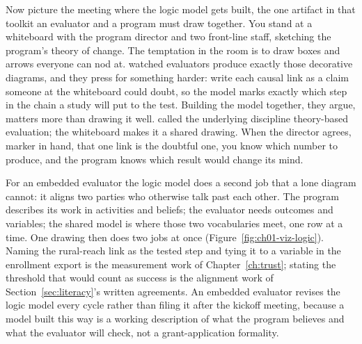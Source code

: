 Now picture the meeting where the logic model gets built, the one artifact in that toolkit an evaluator and a program must draw together. You stand at a whiteboard with the program director and two front-line staff, sketching the program's theory of change. The temptation in the room is to draw boxes and arrows everyone can nod at. \textcite{funnell2011purposeful} watched evaluators produce exactly those decorative diagrams, and they press for something harder: write each causal link as a claim someone at the whiteboard could doubt, so the model marks exactly which step in the chain a study will put to the test. Building the model together, they argue, matters more than drawing it well. \textcite{weiss1998evaluation} called the underlying discipline theory-based evaluation; the whiteboard makes it a shared drawing. When the director agrees, marker in hand, that one link is the doubtful one, you know which number to produce, and the program knows which result would change its mind.

For an embedded evaluator the logic model does a second job that a lone diagram cannot: it aligns two parties who otherwise talk past each other. The program describes its work in activities and beliefs; the evaluator needs outcomes and variables; the shared model is where those two vocabularies meet, one row at a time. One drawing then does two jobs at once (Figure~\ref{fig:ch01-viz-logic}). Naming the rural-reach link as the tested step and tying it to a variable in the enrollment export is the measurement work of Chapter~\ref{ch:trust}; stating the threshold that would count as success is the alignment work of Section~\ref{sec:literacy}'s written agreements. An embedded evaluator revises the logic model every cycle rather than filing it after the kickoff meeting, because a model built this way is a working description of what the program believes and what the evaluator will check, not a grant-application formality.

